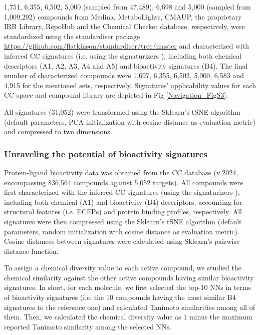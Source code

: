 1,751, 6,355, 6,502, 5,000 (sampled from 47,489), 6,698 and 5,000 (sampled from 1,009,292) compounds from Medina, MetaboLights, CMAUP, the proprietary IRB Library, RepoHub and the Chemical Checker database, respectively, were standardized using the standardiser package \href{https://github.com/flatkinson/standardiser/tree/master}{https://github.com/flatkinson/standardiser/tree/master} and characterized with inferred CC signatures (i.e. using the signaturizers \cite{bertoni_bioactivity_2021}), including both chemical descriptors (A1, A2, A3, A4 and A5) and bioactivity signatures (B4). The final number of characterized compounds were 1,697, 6,355, 6,502, 5,000, 6,583 and 4,915 for the mentioned sets, respectively. Signatures' applicability values for each CC space and compound library are depicted in Fig \ref{Navigation_FigS3}.

All signatures (31,052) were transformed using the Sklearn’s \cite{pedregosa_scikit-learn_2011} tSNE algorithm (default parameters, PCA initialization with cosine distance as evaluation metric) and compressed to two dimensions.

\subsubsection{Unraveling the potential of bioactivity signatures}

Protein-ligand bioactivity data was obtained from the CC database (v.2024, encompassing 836,564 compounds against 5,052 targets). All compounds were first characterized with the inferred CC signatures (using the signaturizers \cite{bertoni_bioactivity_2021}), including both chemical (A1) and bioactivity (B4) descriptors, accounting for structural features (i.e. ECFPs) and protein binding profiles, respectively. All signatures were then compressed using the Sklearn’s \cite{pedregosa_scikit-learn_2011} tSNE algorithm (default parameters, random initialization with cosine distance as evaluation metric). Cosine distances between signatures were calculated using Sklearn’s pairwise distance function. 

To assign a chemical diversity value to each active compound, we studied the chemical similarity against the other active compounds having similar bioactivity signatures. In short, for each molecule, we first selected the top-10 NNs in terms of bioactivity signatures (i.e. the 10 compounds having the most similar B4 signatures to the reference one) and calculated Tanimoto similarities among all of them. Then, we calculated the chemical diversity value as 1 minus the maximum reported Tanimoto similarity among the selected NNs. 